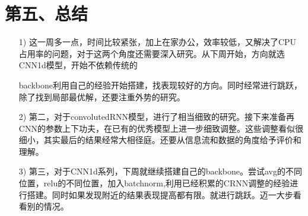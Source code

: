 \documentclass[11pt]{ctexart}
\begin{document}
\section{第五、总结}
\begin{itemize}
  \item [1)]
  这一周多一点，时间比较紧张，加上在家办公，效率较低，又解决了CPU占用率的问题，对于这两个角度还需要深入研究。从下周开始，方向就选CNN1d模型，开始不依赖传统的 \par backbone利用自己的经验开始搭建，找表现较好的方向。同时经常进行跳跃，除了找到局部最优解，还要注重外势的研究。
  \item [2)]
  第二，对于convolutedRNN模型，进行了相当细致的研究。接下来准备再CNN的参数上下功夫，在已有的优秀模型上进一步细致调整。这些调整看似很细小，其实最后的结果经常大相径庭。还要从信息流和数据的角度给予评价和理解。
  \item [3)]
  第三，对于CNN1d系列，下周就继续搭建自己的backbone。尝试avg的不同位置，relu的不同位置，加入batchnorm,利用已经积累的CRNN调整的经验进行搭建。同时如果发现附近的结果表现提高都有限。就进行跳跃。迈一大步看看别的情况。
\end{itemize}
\end{document}
